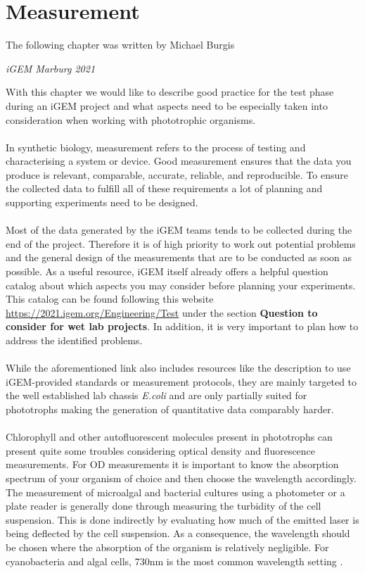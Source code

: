 \section{Measurement}
\epigraph{The following chapter was written by Michael Burgis}{\textit{iGEM Marburg 2021}}
\noindent
With this chapter we would like to describe good practice for the test phase during an iGEM project and what aspects need to be especially taken into consideration when working with phototrophic organisms.
\\ \\
In synthetic biology, measurement refers to the process of testing and characterising a system or device. Good measurement ensures that the data you produce is relevant, comparable, accurate, reliable, and reproducible.
To ensure the collected data to fulfill all of these requirements a lot of planning and supporting experiments need to be designed.
\\ \\
Most of the data generated by the iGEM teams tends to be collected during the end of the project. Therefore it is of high priority to work out potential problems and the general design of the measurements that are to be conducted as soon as possible. As a useful resource, iGEM itself already offers a helpful question catalog about which aspects you may consider before planning your experiments. This catalog can be found following this website \\ \href{https://2021.igem.org/Engineering/Test}{https://2021.igem.org/Engineering/Test} under the section \textbf{Question to consider for wet lab projects}.
In addition, it is very important to plan how to address the identified problems.
\\ \\
While the aforementioned link also includes resources like the description to use iGEM-provided standards or measurement protocols, they are mainly targeted to the well established lab chassis \textit{E.coli} and are only partially suited for phototrophs making the generation of quantitative data comparably harder.
\\ \\
Chlorophyll and other autofluorescent molecules present in phototrophs can present quite some troubles considering optical density and fluorescence measurements. 
For OD measurements it is important to know the absorption spectrum of your organism of choice and then choose the wavelength accordingly. The measurement of microalgal and bacterial cultures using a photometer or a plate reader is generally done through measuring the turbidity of the cell suspension. This is done indirectly by evaluating how much of the emitted laser is being deflected by the cell suspension. As a consequence, the wavelength should be chosen where the absorption of the organism is relatively negligible. For cyanobacteria and algal cells, 730nm is the most common wavelength setting \parencite{Crozet2018} \parencite{Niederholtmeyer2010} \parencite{Yu2015} \parencite{Wlodarczyk2020} \parencite{Kachel2020}.
